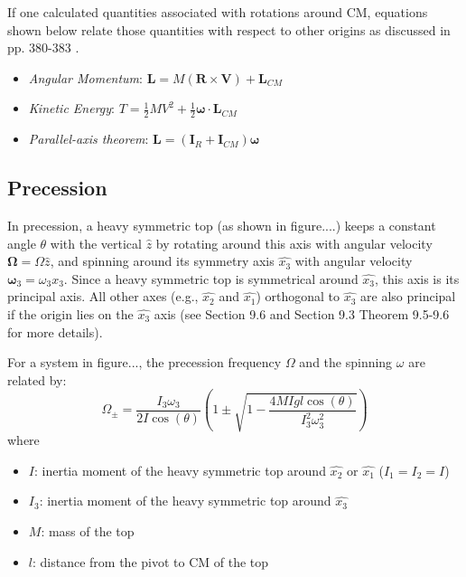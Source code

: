 If one calculated quantities associated with rotations around CM, equations shown below relate those quantities with respect to other origins as discussed in pp. 380-383 \cite{1}.
\begin{itemize}
\item \emph{Angular Momentum}: $\mathbf{L} = M(\mathbf{R} \times \mathbf{V}) + \mathbf{L}_{CM}$
\item \emph{Kinetic Energy}: $T = \frac{1}{2}MV^2 + \frac{1}{2}\boldsymbol\omega \cdot \mathbf{L}_{CM}$
\item \emph{Parallel-axis theorem}: $\mathbf{L} = \left( \mathbf{I}_{R} + \mathbf{I}_{CM} \right) \boldsymbol\omega$
\end{itemize}

\subsection{Precession}
\label{sec:theory:precession}

In precession, a heavy symmetric top (as shown in figure....) keeps a constant angle $\theta$ with the vertical $\hat{z}$ by rotating around this axis with angular velocity $\boldsymbol\Omega = \Omega \hat{z}$, and spinning around its symmetry axis $\hat{x_{3}}$ with angular velocity $\boldsymbol\omega_{3} = \omega_{3} \hat{x_{3}}$. Since a heavy symmetric top is symmetrical around $\hat{x_{3}}$, this axis is its principal axis. All other axes (e.g., $\hat{x_{2}}$ and $\hat{x_{1}}$) orthogonal to $\hat{x_{3}}$ are also principal if the origin lies on the $\hat{x_{3}}$ axis (see Section 9.6 and Section 9.3 Theorem 9.5-9.6 \cite{1} for more details).

For a system in figure..., the precession frequency $\Omega$ and the spinning $\omega$ are related by:
\begin{equation*}
  \Omega_{\pm} = \frac{I_{3}\omega_3}{2I\cos(\theta)} \left( 1 \pm \sqrt{1 - \frac{4MIgl\cos(\theta)}{I_{3}^{2} \omega_{3}^{2}}}  \right)
\end{equation*}
where
\begin{itemize}
\item $I$: inertia moment of the heavy symmetric top around $\hat{x_{2}}$ or $\hat{x_{1}}$ ($I_{1} = I_{2} = I$)
\item $I_{3}$: inertia moment of the heavy symmetric top around $\hat{x_{3}}$
\item $M$: mass of the top
\item $l$: distance from the pivot to CM of the top
\end{itemize}

